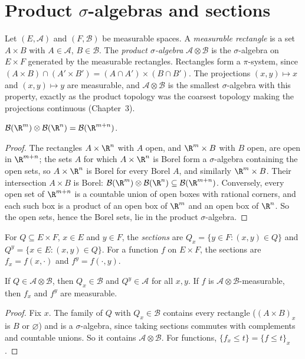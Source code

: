 \section{Product \texorpdfstring{$\sigma$}{sigma}-algebras and sections}

Let $(E,\mathcal A)$ and $(F,\mathcal B)$ be measurable spaces. A \emph{measurable rectangle} is a set $A\times B$ with $A\in\mathcal A$, $B\in\mathcal B$. The \emph{product $\sigma$-algebra}
$\mathcal A\otimes\mathcal B$ is the $\sigma$-algebra on $E\times F$ generated by the measurable rectangles. Rectangles form a $\pi$-system, since $(A\times B)\cap(A'\times B')=(A\cap A')\times(B\cap B')$.
The projections $(x,y)\mapsto x$ and $(x,y)\mapsto y$ are measurable, and $\mathcal A\otimes\mathcal B$ is the smallest $\sigma$-algebra with this property, exactly as the product topology
was the coarsest topology making the projections continuous (Chapter~3).

\begin{proposition}\label{prop:borelproduct}
$\mathcal B(\R^m)\otimes\mathcal B(\R^n)=\mathcal B(\R^{m+n})$.
\end{proposition}
\begin{proof}
The rectangles $A\times\R^n$ with $A$ open, and $\R^m\times B$ with $B$ open, are open in $\R^{m+n}$; the sets $A$ for which $A\times\R^n$ is Borel form a $\sigma$-algebra containing the open sets, so
$A\times\R^n$ is Borel for every Borel $A$, and similarly $\R^m\times B$. Their intersection $A\times B$ is Borel: $\mathcal B(\R^m)\otimes\mathcal B(\R^n)\subseteq\mathcal B(\R^{m+n})$. Conversely, every open set of
$\R^{m+n}$ is a countable union of open boxes with rational corners, and each such box is a product of an open box of $\R^m$ and an open box of $\R^n$. So the open sets, hence the Borel
sets, lie in the product $\sigma$-algebra.
\end{proof}

For $Q\subseteq E\times F$, $x\in E$ and $y\in F$, the \emph{sections} are $Q_x=\{y\in F:(x,y)\in Q\}$ and $Q^y=\{x\in E:(x,y)\in Q\}$. For a function $f$ on $E\times F$, the sections are
$f_x=f(x,\cdot)$ and $f^y=f(\cdot,y)$.

\begin{lemma}\label{lem:sections}
If $Q\in\mathcal A\otimes\mathcal B$, then $Q_x\in\mathcal B$ and $Q^y\in\mathcal A$ for all $x,y$. If $f$ is $\mathcal A\otimes\mathcal B$-measurable, then $f_x$ and $f^y$ are measurable.
\end{lemma}
\begin{proof}
Fix $x$. The family of $Q$ with $Q_x\in\mathcal B$ contains every rectangle ($(A\times B)_x$ is $B$ or $\varnothing$) and is a $\sigma$-algebra, since taking sections commutes with complements
and countable unions. So it contains $\mathcal A\otimes\mathcal B$. For functions, $\{f_x\le t\}=\{f\le t\}_x$.
\end{proof}

